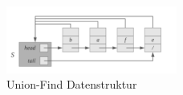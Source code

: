 \begin{figure}
  \centering
  \includegraphics[width=0.5\textwidth]{res/unionFind}

  \caption{Union-Find Datenstruktur}\label{fig:unionFind}
\end{figure}